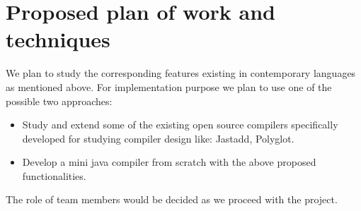 \section{Proposed plan of work and techniques}
We plan to study the corresponding features existing in contemporary languages as mentioned above. 
For implementation purpose we plan to use one of the possible two approaches: 
\begin{itemize}
\item Study and extend some of the existing open source compilers specifically developed for studying compiler design like: Jastadd, Polyglot. 
\item  Develop a mini java compiler from scratch with the above proposed functionalities. 
\end{itemize}
The role of team members would be decided as we proceed with the project.